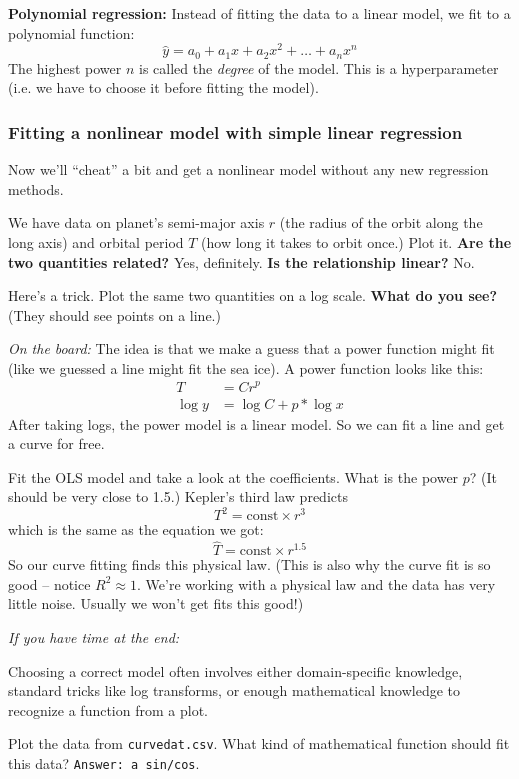 \documentclass{article}
\begin{document}
\textbf{Polynomial regression:} Instead of fitting the data to a linear model, we fit to a polynomial function:
\[
    \hat y = a_0 + a_1 x + a_2 x^2 + \ldots + a_n x^n
\]
The highest power $n$ is called the \emph{degree} of the model. This is a hyperparameter (i.e. we have to choose it before fitting the model).

\subsubsection*{Fitting a nonlinear model with simple linear regression}

Now we'll ``cheat'' a bit and get a nonlinear model without any new regression methods.

We have data on planet's semi-major axis $r$ (the radius of the orbit along the long axis) and orbital period $T$ (how long it takes to orbit once.)
Plot it. \textbf{Are the two quantities related?} Yes, definitely. \textbf{Is the relationship linear?} No.

Here's a trick. Plot the same two quantities on a log scale. \textbf{What do you see?} (They should see points on a line.)

\textit{On the board:}
The idea is that we make a guess that a power function might fit (like we guessed a line might fit the sea ice). A power function looks like this:
\begin{align*}
T &= C r^p \\
\log y &= \log C + p * \log x
\end{align*}
After taking logs, the power model is a linear model. So we can fit a line and get a curve for free.

Fit the OLS model and take a look at the coefficients. What is the power $p$? (It should be very close to 1.5.)
Kepler's third law predicts 
\[
T^2 = \mathrm{const} \times r^3
\]
which is the same as the equation we got:
\[
\hat T = \mathrm{const} \times r^{1.5}
\]
So our curve fitting finds this physical law. (This is also why the curve fit is so good -- notice $R^2 \approx 1$. We're working with a physical law and the data has very little noise. Usually we won't get fits this good!)

\textit{If you have time at the end:}

Choosing a correct model often involves either domain-specific knowledge, standard tricks like log transforms, or enough mathematical knowledge to recognize a function from a plot.

Plot the data from \texttt{curvedat.csv}. What kind of mathematical function should fit this data? \texttt{Answer: a sin/cos}.
\end{document}
